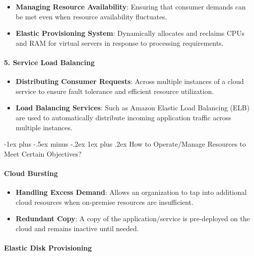 \documentclass[10pt, landscape]{article}
\makeatletter
\renewcommand{\subsubsection}{\@startsection{subsubsection}{3}{0mm}%
  {-1ex plus -.5ex minus -.2ex}%
  {1ex plus .2ex}%
{\normalfont\small\bfseries}}%
\makeatother
\begin{document}
\begin{multicols*}{4}
\begin{itemize}
\tightlist
\item
  \textbf{Managing Resource Availability}: Ensuring that consumer
  demands can be met even when resource availability fluctuates.
\item
  \textbf{Elastic Provisioning System}: Dynamically allocates and
  reclaims CPUs and RAM for virtual servers in response to processing
  requirements.
\end{itemize}

\paragraph{5. Service Load Balancing}\label{service-load-balancing}

\begin{itemize}
\tightlist
\item
  \textbf{Distributing Consumer Requests}: Across multiple instances of
  a cloud service to ensure fault tolerance and efficient resource
  utilization.
\item
  \textbf{Load Balancing Services}: Such as Amazon Elastic Load
  Balancing (ELB) are used to automatically distribute incoming
  application traffic across multiple instances.
\end{itemize}

\subsubsection{How to Operate/Manage Resources to Meet Certain
Objectives?}\label{how-to-operatemanage-resources-to-meet-certain-objectives}

\paragraph{Cloud Bursting}\label{cloud-bursting}

\begin{itemize}
\tightlist
\item
  \textbf{Handling Excess Demand}: Allows an organization to tap into
  additional cloud resources when on-premise resources are insufficient.
\item
  \textbf{Redundant Copy}: A copy of the application/service is
  pre-deployed on the cloud and remains inactive until needed.
\end{itemize}

\paragraph{Elastic Disk Provisioning}\label{elastic-disk-provisioning}


\end{multicols*}
\end{document}
